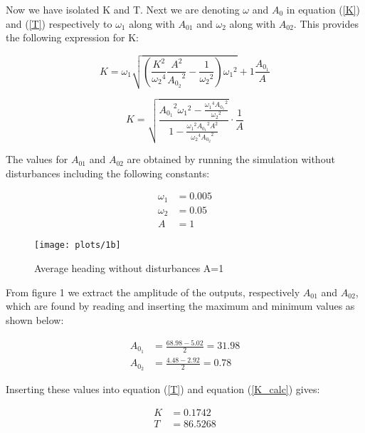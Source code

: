 Now we have isolated K and T. Next we are denoting $\omega$ and $A_0$ in equation (\ref{K}) and (\ref{T}) respectively to $\omega_1$ along with $A_{01}$ and $\omega_2$ along with $A_{02}$. This provides the following expression for K:

\begin{equation}
    K = {\omega _1}\sqrt {\left( {\frac{{{K^2}}}{{{\omega _2}^4}}\frac{{{A}^2}}{{{A_{{0_2}}}^2}} - \frac{1}{{{\omega _2}^2}}} \right){\omega _1}^2}  + 1\frac{{{A_{{0_1}}}}}{{{A}}}
\end{equation}

\begin{equation}\label{K_calc}
    K = \sqrt {\frac{{{A_{{0_1}}}^2{\omega _1}^2 - \frac{{{\omega _1}^4{A_{{0_1}}}^2}}{{{\omega _2}^2}}}}{{1 - \frac{{{\omega _1}^2{A_{{0_1}}}^2{A}^2}}{{{\omega _2}^4{A_{{0_2}}}^2}}}}}  \cdot \frac{1}{{{A}}}
\end{equation}

The values for $A_{01}$ and $A_{02}$ are obtained by running the simulation without disturbances including the following constants:

\begin{align*}
\omega_1 &= 0.005\\
\omega_2 &= 0.05\\
A &= 1
\end{align*}

\begin{figure}[!htb]
    \caption{Average heading without disturbances A=1}
    \centering
    \centerline{\texttt{[image: plots/1b]}}
\end{figure}





From figure 1 we extract the amplitude of the outputs, respectively $A_{01}$ and $A_{02}$, which are found by reading and inserting the maximum and minimum values as shown below:

\begin{align*}
{A_{{0_1}}}  &= \frac{{68.98 - 5.02}}{2} = 31.98\\
{A_{{0_2}}} &= \frac{{4.48 - 2.92}}{2} = 0.78
\end{align*}

Inserting these values into equation (\ref{T}) and equation (\ref{K_calc}) gives:

\begin{align*}
K  &= 0.1742\\
T &= 86.5268
\end{align*}







